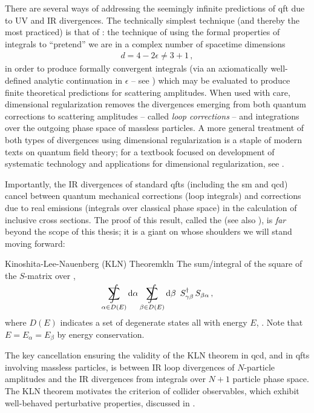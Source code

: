 There are several ways of addressing the seemingly infinite predictions of \gls{qft} due to UV and IR divergences.
%
The technically simplest technique (and thereby the most practiced) is that of :
%
the technique of using the formal properties of integrals to ``pretend'' we are in a complex number of spacetime dimensions
\begin{align}
    d = 4 - 2\epsilon \neq 3 + 1
    \,,
\end{align}
in order to produce formally convergent integrals (via an axiomatically well-defined analytic continuation in \(\epsilon\) -- see ) which may be evaluated to produce finite theoretical predictions for scattering amplitudes.
%
When used with care, dimensional regularization removes the divergences emerging from both quantum corrections to scattering amplitudes -- called \textit{loop corrections} -- and integrations over the outgoing phase space of massless particles.
%
A more general treatment of both types of divergences using dimensional regularization is a staple of modern texts on quantum field theory;
%
for a textbook focused on development of systematic technology and applications for dimensional regularization, see .


Importantly, the IR divergences of standard \glspl{qft} (including the \gls{sm} and \gls{qcd}) cancel between quantum mechanical corrections (loop integrals) and corrections due to real emissions (integrals over classical phase space) in the calculation of inclusive cross sections.
%
The proof of this result, called the  \cite{Kinoshita:1962ur,Lee:1964is,} (see also ), is \textit{far} beyond the scope of this thesis;
%
it is a giant on whose shoulders we will stand moving forward:

\begin{theorembox}{Kinoshita-Lee-Nauenberg (KLN) Theorem}{kln}
    The sum/integral of the square of the \(S\)-matrix over ,
    \begin{align}
        \SumInt_{\alpha \in D(E)}
        \dd \alpha
        \SumInt_{\beta \in  D(E)}
        \dd \beta
        \,\,\,
        S^\dagger_{\gamma \beta}
        \,
        S_{\beta \alpha}
        \,,
    \end{align}
    where \(D(E)\) indicates a set of degenerate states all with energy \(E\), .
    Note that \(E = E_\alpha = E_\beta\) by energy conservation.
\end{theorembox}
%
The key cancellation ensuring the validity of the KLN theorem in \gls{qcd}, and in \glspl{qft} involving massless particles, is between IR loop divergences of \(N\)-particle amplitudes and the IR divergences from integrals over \(N+1\) particle phase space.
%
The KLN theorem motivates the criterion of  collider \glspl{observable}, which exhibit well-behaved perturbative properties, discussed in .


